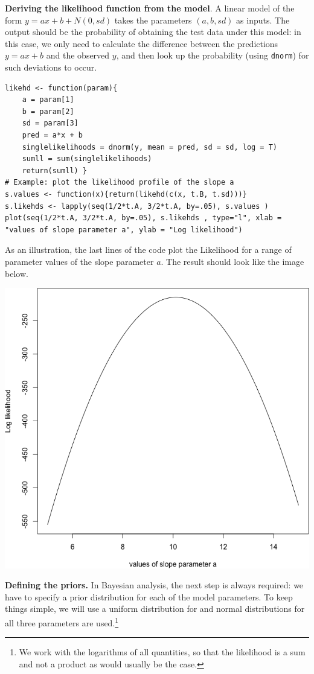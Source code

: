 \begin{Example}
\item \textbf{Deriving the likelihood function from the model}. A linear model of the form $y = ax + b + N(0,sd)$ takes the parameters $(a, b, sd)$ as inputs. The output should be the probability of obtaining the test data under this model: in this case, we only need to calculate the difference between the predictions $y = ax + b$ and the observed $y$, and then look up the probability (using \texttt{dnorm}) for such deviations to occur.

\begin{lstlisting}
likehd <- function(param){
    a = param[1]
    b = param[2]
    sd = param[3]
    pred = a*x + b
    singlelikelihoods = dnorm(y, mean = pred, sd = sd, log = T)
    sumll = sum(singlelikelihoods)
    return(sumll) }
# Example: plot the likelihood profile of the slope a
s.values <- function(x){return(likehd(c(x, t.B, t.sd)))}
s.likehds <- lapply(seq(1/2*t.A, 3/2*t.A, by=.05), s.values )
plot(seq(1/2*t.A, 3/2*t.A, by=.05), s.likehds , type="l", xlab = "values of slope parameter a", ylab = "Log likelihood")
\end{lstlisting}
\noindent As an illustration, the last lines of the code plot the Likelihood for a range of parameter values of the slope parameter $a$. The result should look like the image below. 
\begin{center}
		\includegraphics[width=0.9\linewidth]{Images/example9b.png}
\end{center}
\item \textbf{Defining the priors.} In Bayesian analysis, the next step is always required: we have to specify a prior distribution for each of the model parameters. To keep things simple, we will use a uniform distribution for  and normal distributions for all three parameters are used.\footnote{We work with the logarithms of all quantities, so that the likelihood is a sum and not a product as would usually be the case.} 

\end{Example}
